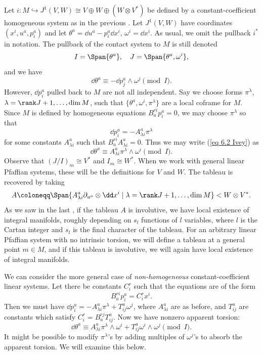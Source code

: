 \begin{example}\label{ex linear pfaff}
    Let $i:M\hookrightarrow J^1(V,W)\cong V\oplus W\oplus (W\otimes V^\ast)$ be defined by a constant-coefficient homogeneous system as in the previous \subsect. Let $J^1(V,W)$ have coordinates $(x^i,u^a,p^a_i)$ and let $\theta^a=\dd u^a-p^a_i \dd x^i$, $\omega^i=\dd x^i$. As usual, we omit the pullback $i^\ast$ in notation. The pullback of the contact system to $M$ is still denoted 
    \[I=\Span\{\theta^a\},\quad J=\Span\{\theta^a,\omega^i\},\]
    and we have 
    \[\dd\theta^a\equiv -\dd p^a_j\wedge \omega^j\pmod{I}.\label{eq 6.2 Ivey}\]
    However, $\dd p^a_i$ pulled back to $M$ are not all independent. Say we choose forms $\pi^\lambda$, $\lambda=\rank J+1,\ldots,\dim M$, such that $\{\theta^a,\omega^i,\pi^\lambda\}$ are a local coframe for $M$. Since $M$ is defined by homogeneous equations $B^{ri}_a p^a_i=0$, we may choose  $\pi^\lambda$ so that 
    \[\dd p^a_i=-A^a_{\lambda i}\pi^\lambda\]
    for some constants $A^a_{\lambda i}$ such that $B^{ri}_a A^a_{\lambda i}=0$. Thus we may write (\ref{eq 6.2 Ivey}) as 
    \[\dd\theta^a\equiv A^a_{\lambda i}\pi^\lambda\wedge\omega^i \pmod{I}.\]
    Observe that $(J\slash I)_m\cong V^\ast$  and $I_m\cong W^\ast$. When we work with general linear Pfaffian systems, these will be the definitions for $V$ and $W$. The tableau is recovered by taking 
    \[A\coloneqq \Span\{A^a_{\lambda i}\partial_{u^a}\otimes \dd x^i\mid \lambda=\rank J+1,\ldots,\dim M\}< W\otimes V^\ast.\]
    As we saw in the last \subsect, if the tableau $A$ is involutive, we have local existence of integral manifolds, roughly depending on $s_l$ functions of $l$ variables, where $l$ is the Cartan integer and $s_l$ is the final character of the tableau. For an arbitrary linear Pfaffian system with no intrinsic torsion, we will define a tableau at a general point $m\in M$, and if this tableau is involutive, we will again have local existence of integral manifolds.
\end{example}


\begin{rem}\label{rem 6.3.1 Ivey}
    We can consider the more general case of \emph{non-homogeneous} constant-coefficient linear systems. Let there be constants $C^r_i$ such that the equations are of the form 
    \[B^{ri}_a p^a_i=C^r_i x^i.\]
    Then we must have $\dd p^a_i=-A^a_{\lambda i}\pi^\lambda+T^a_{ij}\omega^j$, where $A^a_{\lambda i}$ are as before, and $T^a_{ij}$ are constants which satisfy $C^r_i=B_a^{rj}T^a_{ij}$. Now we have nonzero apparent torsion:
    \[\dd\theta^a\equiv A^a_{\lambda i}\pi^\lambda \wedge \omega^i+T^a_{ij}\omega^i\wedge\omega^j\pmod{I}.\]
    It might be possible to modify $\pi^\lambda$'s by adding multiples of $\omega^j$'s to absorb the apparent torsion. We will examine this below.
\end{rem}

